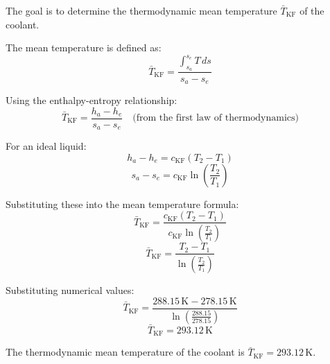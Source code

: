 The goal is to determine the thermodynamic mean temperature \( \bar{T}_{\text{KF}} \) of the coolant.  

The mean temperature is defined as:  
\[
\bar{T}_{\text{KF}} = \frac{\int_{s_a}^{s_e} T \, ds}{s_a - s_e}
\]  

Using the enthalpy-entropy relationship:  
\[
\bar{T}_{\text{KF}} = \frac{h_a - h_e}{s_a - s_e} \quad \text{(from the first law of thermodynamics)}
\]  

For an ideal liquid:  
\[
h_a - h_e = c_{\text{KF}}(T_2 - T_1)
\]  
\[
s_a - s_e = c_{\text{KF}} \ln \left( \frac{T_2}{T_1} \right)
\]  

Substituting these into the mean temperature formula:  
\[
\bar{T}_{\text{KF}} = \frac{c_{\text{KF}}(T_2 - T_1)}{c_{\text{KF}} \ln \left( \frac{T_2}{T_1} \right)}
\]  
\[
\bar{T}_{\text{KF}} = \frac{T_2 - T_1}{\ln \left( \frac{T_2}{T_1} \right)}
\]  

Substituting numerical values:  
\[
\bar{T}_{\text{KF}} = \frac{288.15 \, \text{K} - 278.15 \, \text{K}}{\ln \left( \frac{288.15}{278.15} \right)}
\]  
\[
\bar{T}_{\text{KF}} = 293.12 \, \text{K}
\]  

The thermodynamic mean temperature of the coolant is \( \bar{T}_{\text{KF}} = 293.12 \, \text{K} \).